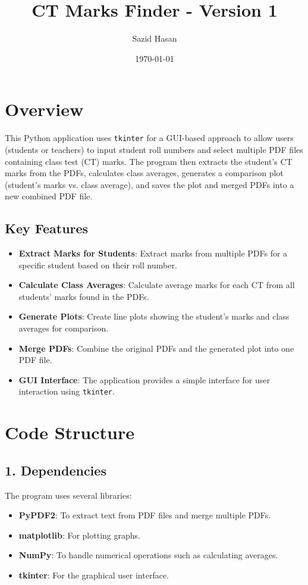 \documentclass{article}
\title{CT Marks Finder - Version 1 }
\author{Sazid Hasan}
\date{\today}
\begin{document}
\maketitle

\section{Overview}

This Python application uses \texttt{tkinter} for a GUI-based approach to allow users (students or teachers) to input student roll numbers and select multiple PDF files containing class test (CT) marks. The program then extracts the student's CT marks from the PDFs, calculates class averages, generates a comparison plot (student's marks vs. class average), and saves the plot and merged PDFs into a new combined PDF file.

\subsection*{Key Features}
\begin{itemize}
    \item \textbf{Extract Marks for Students}: Extract marks from multiple PDFs for a specific student based on their roll number.
    \item \textbf{Calculate Class Averages}: Calculate average marks for each CT from all students' marks found in the PDFs.
    \item \textbf{Generate Plots}: Create line plots showing the student's marks and class averages for comparison.
    \item \textbf{Merge PDFs}: Combine the original PDFs and the generated plot into one PDF file.
    \item \textbf{GUI Interface}: The application provides a simple interface for user interaction using \texttt{tkinter}.
\end{itemize}

\section{Code Structure}

\subsection{1. Dependencies}
The program uses several libraries:
\begin{itemize}
    \item \textbf{PyPDF2}: To extract text from PDF files and merge multiple PDFs.
    \item \textbf{matplotlib}: For plotting graphs.
    \item \textbf{NumPy}: To handle numerical operations such as calculating averages.
    \item \textbf{tkinter}: For the graphical user interface.
\end{itemize}
\end{document}
